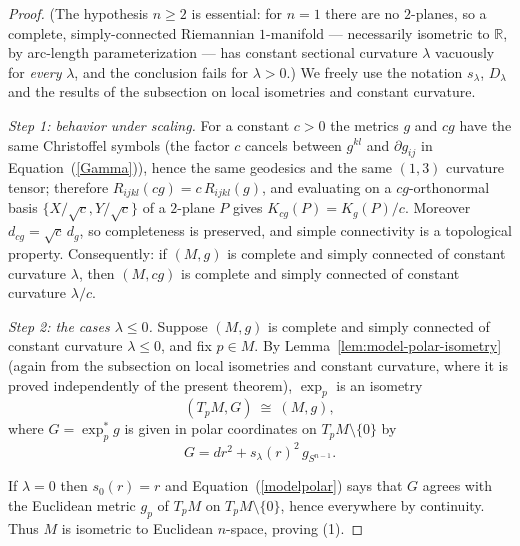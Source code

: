 \begin{proof}
(The hypothesis $n\ge2$ is essential: for $n=1$ there are no
$2$-planes, so a complete, simply-connected Riemannian
$1$-manifold --- necessarily isometric to $\mathbb{R}$, by
arc-length parameterization --- has constant sectional curvature
$\lambda$ vacuously for \emph{every} $\lambda$, and the conclusion
fails for $\lambda>0$.) We freely use the notation
$s_\lambda$, $D_\lambda$ and the results of the subsection on local
isometries and constant curvature.

\emph{Step 1: behavior under scaling.} For a constant $c>0$ the
metrics $g$ and $cg$ have the same Christoffel symbols (the factor
$c$ cancels between $g^{kl}$ and $\partial g_{ij}$ in
Equation~(\ref{Gamma})), hence the same geodesics and the same
$(1,3)$ curvature tensor; therefore $R_{ijkl}(cg)=c\,R_{ijkl}(g)$,
and evaluating on a $cg$-orthonormal basis $\{X/\sqrt c,Y/\sqrt
c\}$ of a $2$-plane $P$ gives $K_{cg}(P)=K_g(P)/c$. Moreover
$d_{cg}=\sqrt{c}\,d_g$, so completeness is preserved, and simple
connectivity is a topological property. Consequently: if $(M,g)$ is
complete and simply connected of constant curvature $\lambda$, then
$(M,cg)$ is complete and simply connected of constant curvature
$\lambda/c$.

\emph{Step 2: the cases $\lambda\le 0$.} Suppose $(M,g)$ is
complete and simply connected of constant curvature $\lambda\le 0$,
and fix $p\in M$. By Lemma~\ref{lem:model-polar-isometry} (again
from the subsection on local isometries and constant curvature,
where it is proved independently of the present theorem),
$\exp_p$ is an isometry
$$(T_pM,G)\ \cong\ (M,g),$$
where $G=\exp_p^*g$ is given in polar coordinates on
$T_pM\setminus\{0\}$ by
\begin{equation}\label{modelpolar}
G=dr^2+s_\lambda(r)^2\,g_{S^{n-1}}.
\end{equation}

If $\lambda=0$ then $s_0(r)=r$ and Equation~(\ref{modelpolar})
says that $G$ agrees with the Euclidean metric $g_{p}$ of $T_pM$ on
$T_pM\setminus\{0\}$, hence everywhere by continuity. Thus $M$ is
isometric to Euclidean $n$-space, proving (1).


\end{proof}
